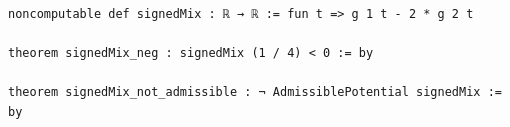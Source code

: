 \begin{Verbatim}[fontsize=\scriptsize,frame=single,framesep=1.5mm]
noncomputable def signedMix : ℝ → ℝ := fun t => g 1 t - 2 * g 2 t

theorem signedMix_neg : signedMix (1 / 4) < 0 := by

theorem signedMix_not_admissible : ¬ AdmissiblePotential signedMix := by
\end{Verbatim}
